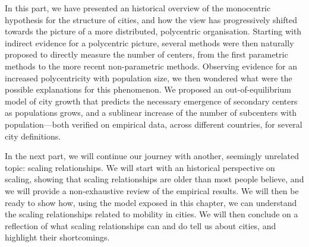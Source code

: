 In this part, we have presented an historical overview of the monocentric
hypothesis for the structure of cities, and how the view has progressively
shifted towards the picture of a more distributed, polycentric organisation.
Starting with indirect evidence for a polycentric picture, several methods were
then naturally proposed to directly measure the number of centers, from the
first parametric methods to the more recent non-parametric methods. Observing
evidence for an increased polycentricity with population size, we then wondered
what were the possible explanations for this phenomenon. We proposed an
out-of-equilibrium model of city growth that predicts the necessary emergence of
secondary centers as populations grows, and a sublinear increase of the number
of subcenters with population---both verified on empirical data, across
different countries, for several city definitions.

In the next part, we will continue our journey with another, seemingly unrelated
topic: scaling relationships. We will start with an historical perspective on
 scaling, showing that scaling relationships are older than most people believe,
 and we will provide a non-exhaustive review of the empirical results. We will
 then be ready to show how, using the model exposed in this chapter, we can
 understand the scaling relationships related to mobility in cities. We will
 then conclude on a reflection of what scaling relationships can and do tell us about cities,
 and highlight their shortcomings.
